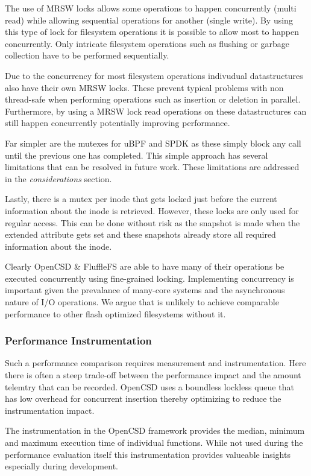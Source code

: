 The use of MRSW locks allows some operations to happen concurrently (multi read)
while allowing sequential operations for another (single write). By using this
type of lock for filesystem operations it is possible to allow most to happen
concurrently. Only intricate filesystem operations such as flushing or garbage
collection have to be performed sequentially.

Due to the concurrency for most filesystem operations indivudual datastructures
also have their own MRSW locks. These prevent typical problems with non
thread-safe when performing operations such as insertion or deletion in
parallel. Furthermore, by using a MRSW lock read operations on these
datastructures can still happen concurrently potentially improving performance.

Far simpler are the mutexes for uBPF and SPDK as these simply block any call
until the previous one has completed. This simple approach has several
limitations that can be resolved in future work. These limitations are addressed
in the \textit{considerations} section.

Lastly, there is a mutex per inode that gets locked just before the current
information about the inode is retrieved. However, these locks are only used for
regular access. This can be done without risk as the snapshot is made when the
extended attribute gets set and these snapshots already store all required
information about the inode.

Clearly OpenCSD \& FluffleFS are able to have many of their operations be executed
concurrently using fine-grained locking. Implementing concurrency is important
given the prevalance of many-core systems and the asynchronous nature of I/O
operations. We argue that is unlikely to achieve comparable performance to other
flash optimized filesystems without it.

\subsubsection{Performance Instrumentation}

Such a performance comparison requires measurement and instrumentation. Here
there is often a steep trade-off between the performance impact and the amount
telemtry that can be recorded. OpenCSD uses a boundless lockless
queue \cite{Michael1996SimpleFA} that has low overhead for concurrent insertion
thereby optimizing to reduce the instrumentation impact.

The instrumentation in the OpenCSD framework provides the median, minimum and
maximum execution time of individual functions. While not used during the
performance evaluation itself this instrumentation provides valueable insights
especially during development.

